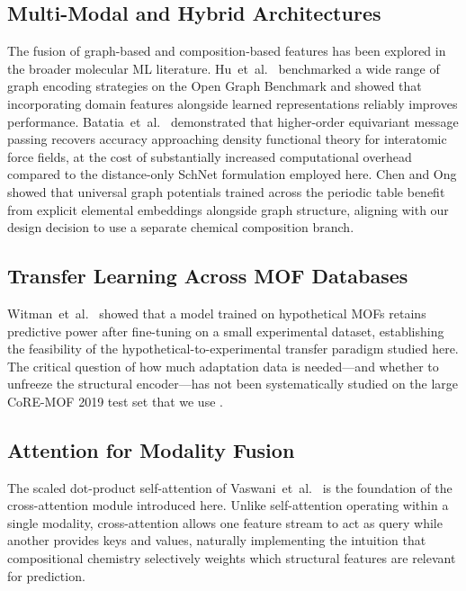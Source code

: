 \documentclass[conference]{IEEEtran}
\begin{document}
\subsection{Multi-Modal and Hybrid Architectures}

The fusion of graph-based and composition-based features has been explored in
the broader molecular ML literature.
Hu~et~al.\ \cite{hu2020ogb} benchmarked a wide range of graph encoding
strategies on the Open Graph Benchmark and showed that incorporating domain
features alongside learned representations reliably improves performance.
Batatia~et~al.\ \cite{mace2022} demonstrated that higher-order equivariant
message passing recovers accuracy approaching density functional theory for
interatomic force fields, at the cost of substantially increased computational
overhead compared to the distance-only SchNet formulation employed here.
Chen and Ong \cite{chen2022universal} showed that universal graph potentials
trained across the periodic table benefit from explicit elemental embeddings
alongside graph structure, aligning with our design decision to use a separate
chemical composition branch.

\subsection{Transfer Learning Across MOF Databases}

Witman~et~al.\ \cite{witman2020} showed that a model trained on hypothetical
MOFs retains predictive power after fine-tuning on a small experimental
dataset, establishing the feasibility of the hypothetical-to-experimental
transfer paradigm studied here.  The critical question of how much adaptation
data is needed—and whether to unfreeze the structural encoder—has not been
systematically studied on the large CoRE-MOF 2019 test set that we use
\cite{coremof2019}.

\subsection{Attention for Modality Fusion}

The scaled dot-product self-attention of Vaswani~et~al.\ \cite{attention2017}
is the foundation of the cross-attention module introduced here.  Unlike
self-attention operating within a single modality, cross-attention allows one
feature stream to act as query while another provides keys and values,
naturally implementing the intuition that compositional chemistry selectively
weights which structural features are relevant for prediction.
\end{document}

